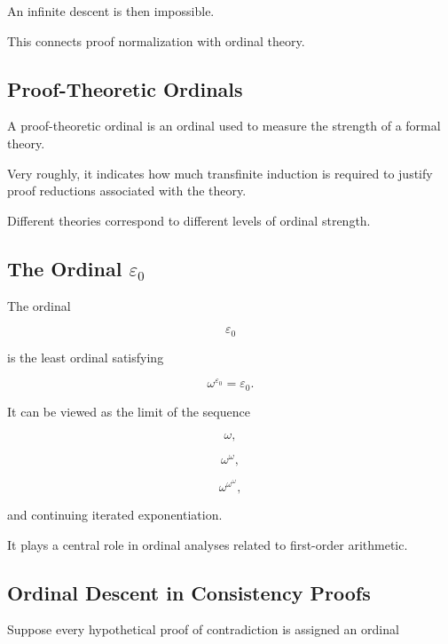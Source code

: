 An infinite descent is then impossible.

This connects proof normalization with ordinal theory.

\subsection{Proof-Theoretic Ordinals}
\label{subsec:proof-theoretic-ordinals}

A proof-theoretic ordinal is an ordinal used to measure the strength of a
formal theory.

Very roughly, it indicates how much transfinite induction is required to
justify proof reductions associated with the theory.

Different theories correspond to different levels of ordinal strength.

\subsection{The Ordinal \(\varepsilon_0\)}
\label{subsec:epsilon-zero}

The ordinal

\[
\boxed{
\varepsilon_0
}
\]

is the least ordinal satisfying

\[
\boxed{
\omega^{\varepsilon_0}
=
\varepsilon_0.
}
\]

It can be viewed as the limit of the sequence

\[
\omega,
\]

\[
\omega^\omega,
\]

\[
\omega^{\omega^\omega},
\]

and continuing iterated exponentiation.

It plays a central role in ordinal analyses related to first-order
arithmetic.

\subsection{Ordinal Descent in Consistency Proofs}
\label{subsec:ordinal-descent}

Suppose every hypothetical proof of contradiction is assigned an ordinal

